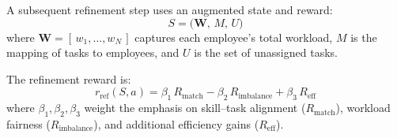 \documentclass[%
aip,
cp,  %
amsmath,amssymb,
reprint,%
]{revtex4-2}
\begin{document}
	A subsequent refinement step uses an augmented state and reward:
	\begin{equation}
		S = \bigl(\mathbf{W},\, M,\, U\bigr)
	\end{equation}
	where $\mathbf{W}=[\,w_{1},\dots,w_{N}\,]$ captures each employee's total workload, $M$ is the mapping of tasks to employees, and $U$ is the set of unassigned tasks.
	
	The refinement reward is:
	\begin{equation}
		r_{\text{ref}}(S,a) = \beta_{1}\,R_{\text{match}}-\beta_{2}\,R_{\text{imbalance}}+\beta_{3}\,R_{\text{eff}}
	\end{equation}
	where $\beta_{1},\beta_{2},\beta_{3}$ weight the emphasis on skill--task alignment ($R_{\text{match}}$), workload fairness ($R_{\text{imbalance}}$), and additional efficiency gains ($R_{\text{eff}}$).
	
\end{document}
